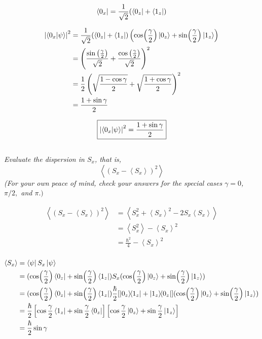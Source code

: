 \documentclass{article}
\begin{document}
$$ \bra{0_x} =  \frac{1}{\sqrt{2}}(\bra{0_z} + \bra{1_z})$$


\begin{align*}
\left|\braket{0_x}{\psi}\right|^2 &= \frac{1}{\sqrt{2}}(\bra{0_z} + \bra{1_z}) \left( \cos (\frac{\gamma }{2}) \ket{0_z} + \sin (\frac{\gamma }{2}) \ket{1_z}\right)\\
&= \left(\frac{\sin \left(\frac{\gamma }{2}\right)}{\sqrt{2}}+\frac{\cos \left(\frac{\gamma }{2}\right)}{\sqrt{2}}\right)^2\\
&= \frac{1}{2}\left(\sqrt{\frac{1-\cos \gamma}{2}}+\sqrt{\frac{1+\cos \gamma}{2}}\right)^{2}\\
&= \frac{1+\sin \gamma}{2}\\
\end{align*}

$$\boxed{\left|\braket{0_x}{\psi}\right|^2= \frac{1+\sin \gamma}{2}}$$

\subsection{}
\textit{Evaluate the dispersion in $S_{x}$, that is,
$$
\left\langle\left(S_{x}-\left\langle S_{x}\right\rangle\right)^{2}\right\rangle
$$
(For your own peace of mind, check your answers for the special cases $\gamma=0$, $\pi / 2,$ and $\pi .)$}

\begin{align*}
    \left\langle\left(S_{x}-\left\langle S_{x}\right\rangle\right)^{2}\right\rangle &= \left\langle S_{x}^2 +\left\langle S_{x}\right\rangle^2 - 2S_{x}\left\langle S_{x}\right\rangle\right\rangle\\
    &= \left\langle S_{x}^{2}\right\rangle-\left\langle S_{x}\right\rangle^{2}\\
    &= \frac{\hbar^2}{4}-\left\langle S_{x}\right\rangle^{2}\\
\end{align*}

\begin{align*}
\left\langle S_{x}\right\rangle &=\bra{\psi}  S_x  \ket{\psi} \\
&=  (\cos (\frac{\gamma }{2}) \bra{0_z} + \sin (\frac{\gamma }{2}) \bra{1_z}) S_x (\cos (\frac{\gamma }{2}) \ket{0_z} + \sin (\frac{\gamma }{2}) \ket{1_z}) \\ 
&=  (\cos (\frac{\gamma }{2}) \bra{0_z} + \sin (\frac{\gamma }{2})\bra{1_z})\frac{\hbar}{2}[\ketbra{0_z}{1_z}+\ketbra{1_z}{0_z}](\cos (\frac{\gamma }{2}) \ket{0_z} + \sin (\frac{\gamma }{2}) \ket{1_z}) \\
&= \frac{\hbar}{2}\left[\cos \frac{\gamma}{2}\bra{1_z}+\sin \frac{\gamma}{2}\bra{0_z} \right]\left[\cos \frac{\gamma}{2}\ket{0_z}+\sin \frac{\gamma}{2}\ket{1_z}\right] \\
&= \frac{\hbar}{2} \sin \gamma
\end{align*}
\end{document}
